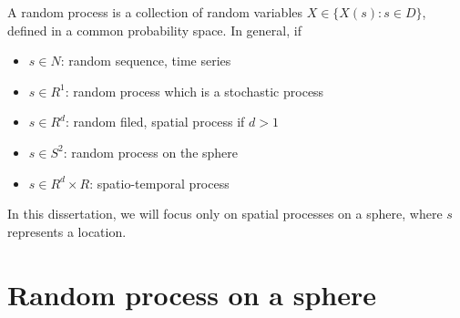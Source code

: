 
A random process is a collection of random variables $X \in \{X(s): s\in D\}$, defined in a common probability space. In general, if
\begin{itemize}
	\item $s \in N$: random sequence, time series
	\item $s \in R^1$: random process which is a stochastic process
	\item $s \in R^d$: random filed, spatial process if $d > 1$
	\item $s \in S^2$: random process on the sphere
	\item $s \in R^d\times R$: spatio-temporal process
\end{itemize}

In this dissertation, we will focus only on spatial processes on a sphere, where $s$ represents a location.


\section{Random process on a sphere} 


